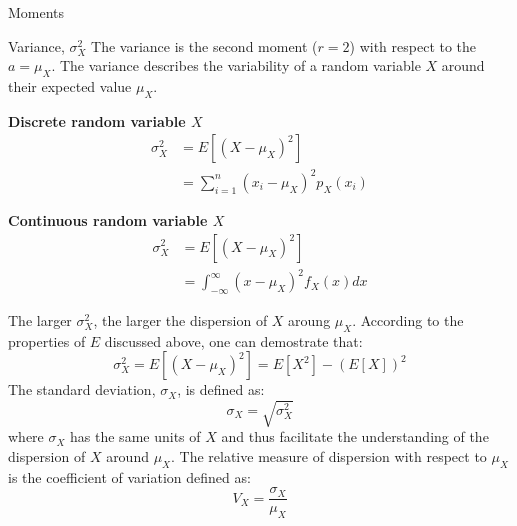 \documentclass[8pt]{beamer}
\begin{document}
\begin{frame}{Moments}
    \begin{block}{Variance, $\sigma_X^2$}
        The \alert{variance} is the second moment ($r = 2$) with respect to the $a = \mu_X$. The \alert{variance} describes the variability of a random variable $X$ around their expected value $\mu_X$.
\begin{minipage}[t]{0.49\textwidth}
\centering
\textbf{Discrete random variable $X$}
\begin{align*}
    \sigma_X^2 &= E \left[ (X - \mu_X)^2 \right] \\ 
               &= \sum_{i=1}^n (x_i - \mu_X)^2 p_X (x_i)
\end{align*}
\end{minipage}
\hfill
\begin{minipage}[t]{0.49\textwidth}
\centering
\textbf{Continuous random variable $X$}
\begin{align*}
    \sigma_X^2 &= E \left[ (X - \mu_X)^2 \right] \\
               &= \int_{-\infty}^{\infty} (x - \mu_X)^2 f_X (x) dx
\end{align*}
\end{minipage}
The larger $\sigma_X^2$, the larger the dispersion of $X$ aroung $\mu_X$. According to the properties of $E$ discussed above, one can demostrate that:
\[
    \sigma_X^2 = E \left[ (X - \mu_X)^2 \right] = E [X^2] - \left( E[X] \right)^2
\]
The \alert{standard deviation}, $\sigma_X$, is defined as:
\[
    \sigma_X = \sqrt{\sigma_X^2}
\]
where $\sigma_X$ has the same units of $X$ and thus facilitate the understanding of the dispersion of $X$ around $\mu_X$. The relative measure of dispersion with respect to $\mu_X$ is the \alert{coefficient of variation} defined as:
\[
    V_X = \frac{\sigma_X}{\mu_X}
\]
\end{block}
\end{frame}
\end{document}
